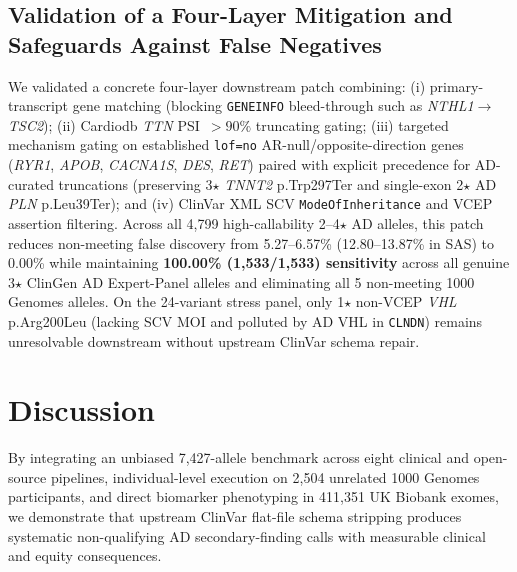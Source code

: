 \documentclass[11pt,letterpaper]{article}
\begin{document}
\subsection{Validation of a Four-Layer Mitigation and Safeguards Against False Negatives}
We validated a concrete four-layer downstream patch combining: (i) primary-transcript gene matching (blocking \texttt{GENEINFO} bleed-through such as \textit{NTHL1}$\rightarrow$\textit{TSC2}); (ii) Cardiodb \textit{TTN} PSI~$>90\%$ truncating gating; (iii) targeted mechanism gating on established \texttt{lof=no} AR-null/opposite-direction genes (\textit{RYR1}, \textit{APOB}, \textit{CACNA1S}, \textit{DES}, \textit{RET}) paired with explicit precedence for AD-curated truncations (preserving 3$\star$ \textit{TNNT2} p.Trp297Ter and single-exon 2$\star$ AD \textit{PLN} p.Leu39Ter); and (iv) ClinVar XML SCV \texttt{ModeOfInheritance} and VCEP assertion filtering. Across all 4,799 high-callability 2--4$\star$ AD alleles, this patch reduces non-meeting false discovery from 5.27--6.57\% (12.80--13.87\% in SAS) to 0.00\% while maintaining \textbf{100.00\% (1,533/1,533) sensitivity} across all genuine 3$\star$ ClinGen AD Expert-Panel alleles and eliminating all 5 non-meeting 1000 Genomes alleles. On the 24-variant stress panel, only 1$\star$ non-VCEP \textit{VHL} p.Arg200Leu (lacking SCV MOI and polluted by AD VHL in \texttt{CLNDN}) remains unresolvable downstream without upstream ClinVar schema repair.

\section{Discussion}
By integrating an unbiased 7,427-allele benchmark across eight clinical and open-source pipelines, individual-level execution on 2,504 unrelated 1000 Genomes participants, and direct biomarker phenotyping in 411,351 UK Biobank exomes, we demonstrate that upstream ClinVar flat-file schema stripping produces systematic non-qualifying AD secondary-finding calls with measurable clinical and equity consequences.
\end{document}
